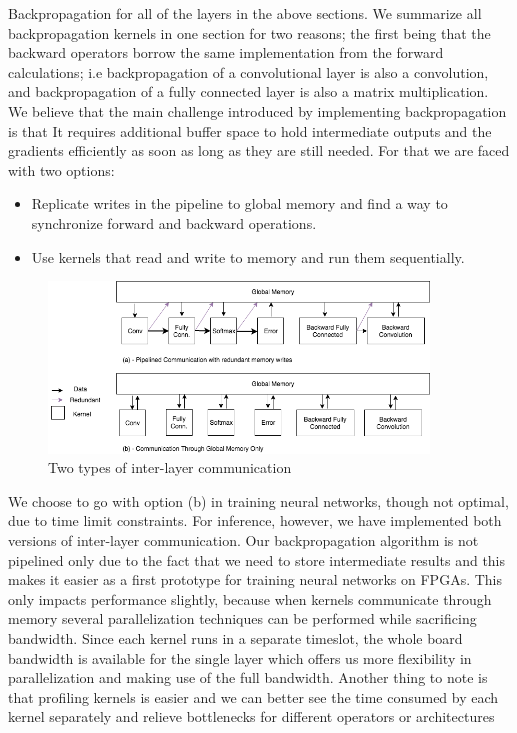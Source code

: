 Backpropagation for all of the layers in the above sections. We summarize all backpropagation kernels in one section for two reasons; the first being that the backward operators borrow the same implementation from the forward calculations; i.e backpropagation of a convolutional layer is also a convolution, and backpropagation of a fully connected layer is also a matrix multiplication. We believe that the main challenge introduced by implementing backpropagation is that It requires additional buffer space to hold intermediate outputs and the gradients efficiently as soon as long as they are still needed. For that we are faced with two options:
\begin{itemize}
\item
Replicate writes in the pipeline to global memory and find a way to synchronize forward and backward operations.
\item
Use kernels that read and write to memory and run them sequentially.
\end{itemize}

\begin{figure}[h]
\centering
\includegraphics[width=0.9\textwidth]{Figures/comm}
\caption[Types of inter-layer communication]{ Two types of inter-layer communication }
\label{fig:comm}
\end{figure}

We choose to go with option (b) in training neural networks, though not optimal, due to time limit constraints. For inference, however, we have implemented both versions of inter-layer communication. Our backpropagation algorithm is not pipelined only due to the fact that we need to store intermediate results and this makes it easier as a first prototype for training neural networks on FPGAs. This only impacts performance slightly, because when kernels communicate through memory several parallelization techniques can be performed while sacrificing bandwidth. Since each kernel runs in a separate timeslot, the whole board bandwidth is available for the single layer which offers us more flexibility in parallelization and making use of the full bandwidth. Another thing to note is that profiling kernels is easier and we can better see the time consumed by each kernel separately and relieve bottlenecks for different operators or architectures 

